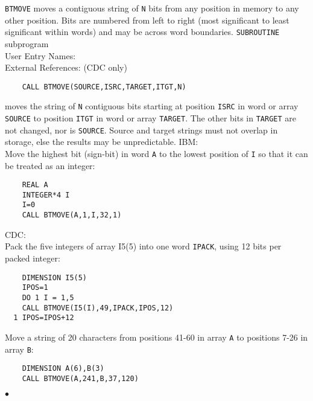                     
                     
\Submitter{}                          
{\tt BTMOVE} moves a contiguous string of {\tt N} bits from any position
in memory to any other position.
Bits are numbered from left to right (most significant to least
significant within words) and may be across word boundaries.
\Structure
{\tt SUBROUTINE} subprogram \\
User Entry Names:  \\
External References:  (CDC only)
\Usage
\begin{verbatim}
    CALL BTMOVE(SOURCE,ISRC,TARGET,ITGT,N)
\end{verbatim}
moves the string of {\tt N} contiguous bits starting at position
{\tt ISRC} in word or array {\tt SOURCE} to position {\tt ITGT} in word
or array {\tt TARGET}. The other bits in {\tt TARGET} are not changed,
nor is {\tt SOURCE}.
\Notes
Source and target strings must not overlap in storage, else the results
may be unpredictable.
\Examples
IBM: \\
Move the highest bit (sign-bit) in word {\tt A} to the lowest
position of {\tt I} so that it can be treated as an integer:
\begin{verbatim}
    REAL A
    INTEGER*4 I
    I=0
    CALL BTMOVE(A,1,I,32,1)
\end{verbatim}
CDC: \\
Pack the five integers of array I5(5) into one word {\tt IPACK}, using
12 bits per packed integer:
\begin{verbatim}
    DIMENSION I5(5)
    IPOS=1
    DO 1 I = 1,5
    CALL BTMOVE(I5(I),49,IPACK,IPOS,12)
  1 IPOS=IPOS+12
\end{verbatim}
Move a string of 20 characters from positions 41-60 in array {\tt A} to
positions 7-26 in array {\tt B}:
\begin{verbatim}
    DIMENSION A(6),B(3)
    CALL BTMOVE(A,241,B,37,120)
\end{verbatim}
$\bullet$
